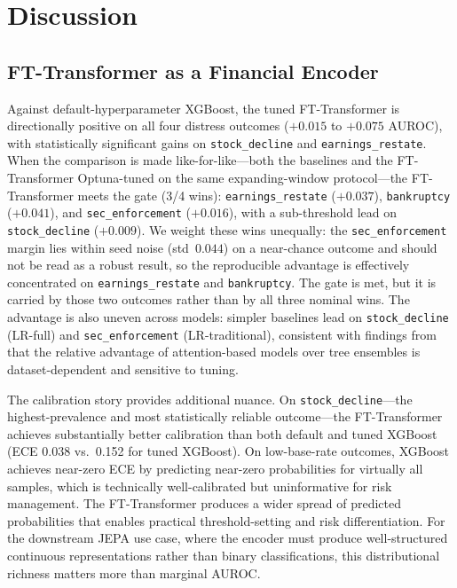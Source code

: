 \section{Discussion}
\label{sec:discussion}

\subsection{FT-Transformer as a Financial Encoder}
\label{sec:disc_encoder}

Against default-hyperparameter XGBoost, the tuned FT-Transformer is directionally positive on all four distress outcomes ($+0.015$ to $+0.075$ AUROC), with statistically significant gains on \texttt{stock\_decline} and \texttt{earnings\_restate}. When the comparison is made like-for-like---both the baselines and the FT-Transformer Optuna-tuned on the same expanding-window protocol---the FT-Transformer meets the gate (3/4 wins): \texttt{earnings\_restate} ($+0.037$), \texttt{bankruptcy} ($+0.041$), and \texttt{sec\_enforcement} ($+0.016$), with a sub-threshold lead on \texttt{stock\_decline} ($+0.009$). We weight these wins unequally: the \texttt{sec\_enforcement} margin lies within seed noise (std~$0.044$) on a near-chance outcome and should not be read as a robust result, so the reproducible advantage is effectively concentrated on \texttt{earnings\_restate} and \texttt{bankruptcy}. The gate is met, but it is carried by those two outcomes rather than by all three nominal wins. The advantage is also uneven across models: simpler baselines lead on \texttt{stock\_decline} (LR-full) and \texttt{sec\_enforcement} (LR-traditional), consistent with findings from \citet{gorishniy2021revisiting} that the relative advantage of attention-based models over tree ensembles is dataset-dependent and sensitive to tuning.

The calibration story provides additional nuance. On \texttt{stock\_decline}---the highest-prevalence and most statistically reliable outcome---the FT-Transformer achieves substantially better calibration than both default and tuned XGBoost (ECE 0.038 vs.\ 0.152 for tuned XGBoost). On low-base-rate outcomes, XGBoost achieves near-zero ECE by predicting near-zero probabilities for virtually all samples, which is technically well-calibrated but uninformative for risk management. The FT-Transformer produces a wider spread of predicted probabilities that enables practical threshold-setting and risk differentiation. For the downstream JEPA use case, where the encoder must produce well-structured continuous representations rather than binary classifications, this distributional richness matters more than marginal AUROC.

